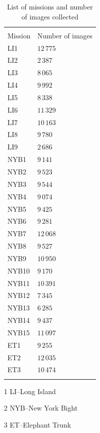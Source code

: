 \documentclass {udthesis}
\begin{document}
\begin{table}
\centering
\begin{threeparttable}
      \begin{tabular}{ll}
      \toprule[1pt]\\[-6pt]
      Mission  & Number of images\\[2pt]\midrule
      LI1\tnote{1}	&$12\,775$\\
      LI2	&$2\,387$\\
      LI3	&$8\,065$\\
      LI4	&$9\,992$\\
      LI5	&$8\,338$\\
      LI6	&$11\,329$\\
      LI7	&$10\,163$\\
      LI8	&$9\,780$\\
      LI9	&$2\,686$\\
      NYB1\tnote{2}	&$9\,141$\\
      NYB2	&$9\,523$\\
      NYB3	&$9\,544$\\
      NYB4	&$9\,074$\\
      NYB5	&$9\,425$\\
      NYB6	&$9\,281$\\
      NYB7	&$12\,068$\\
      NYB8	&$9\,527$\\
      NYB9	&$10\,950$\\
      NYB10	&$9\,170$\\
      NYB11	&$10\,391$\\
      NYB12	&$7\,345$\\
      NYB13	&$6\,285$\\
      NYB14	&$9\,437$\\
      NYB15	&$11\,097$\\
      ET1\tnote{3}	&$9\,255$\\
      ET2	&$12\,035$\\
      ET3	&$10\,474$\\
      \\[2pt]\bottomrule[1pt]
    \end{tabular}
    \begin{tablenotes}
       \vskip 5pt
	  \item[1] \footnotesize{LI--Long Island}
	  \item[2] \footnotesize{NYB--New York Bight}
	  \item[3] \footnotesize{ET--Elephant Trunk}
      \end{tablenotes}                                                      
 \end{threeparttable}
  \caption{List of missions and number of images collected}
  \label{tab:mission_list}
\end{table}
\end{document}
